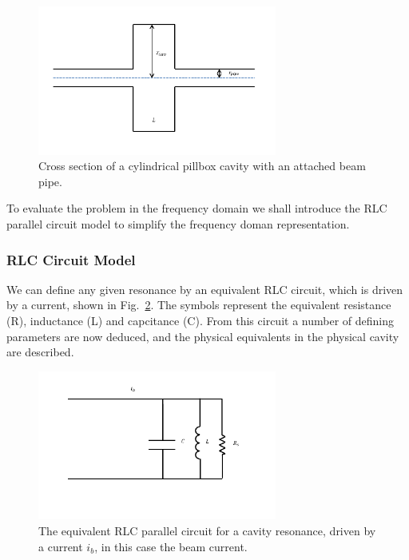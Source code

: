 \begin{figure}
\begin{center}
\includegraphics[width=0.7\textwidth]{Wakefields_and_Impedances/figures/pillbox-cav.pdf}
\end{center}
\caption{Cross section of a cylindrical pillbox cavity with an attached beam pipe.}
\label{fig:cylin_geo_diagram}
\end{figure}

To evaluate the problem in the frequency domain we shall introduce the RLC parallel circuit model to simplify the frequency doman representation.

\subsubsection{RLC Circuit Model}

We can define any given resonance by an equivalent RLC circuit, which is driven by a current, shown in Fig.~\ref{fig:rlc_circ}. The symbols represent the equivalent resistance (R), inductance (L) and capcitance (C). From this circuit a number of defining parameters are now deduced, and the physical equivalents in the physical cavity are described.

\begin{figure}
\begin{center}
\includegraphics[width=0.7\textwidth]{Wakefields_and_Impedances/figures/equiv-circuit.pdf}
\end{center}
\caption{The equivalent RLC parallel circuit for a cavity resonance, driven by a current $i_{b}$, in this case the beam current.}
\label{fig:rlc_circ}
\end{figure}

